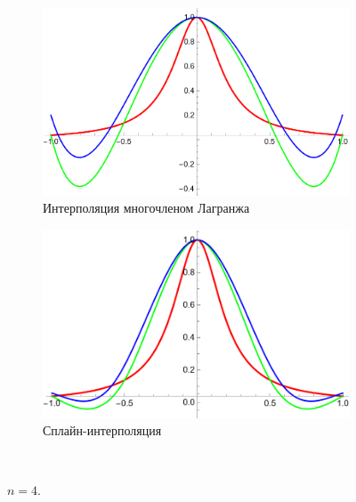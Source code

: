 \documentclass[12pt, a4paper]{article}
\begin{document}
	
	\begin{figure}[H]
		\centering
		\begin{subfigure}{0.4\textwidth}
			\includegraphics[width=\textwidth]{5_l4}
			\caption{Интерполяция многочленом Лагранжа}
		\end{subfigure}
		\hfill
		\begin{subfigure}{0.4\textwidth}
			\includegraphics[width=\textwidth]{5_s4}
			\caption{Сплайн-интерполяция}
		\end{subfigure}
		\hfill
		\\[0.5cm]
		\caption{$n=4$.}
	\end{figure}
	
	
	\hfill
	
\end{document}
